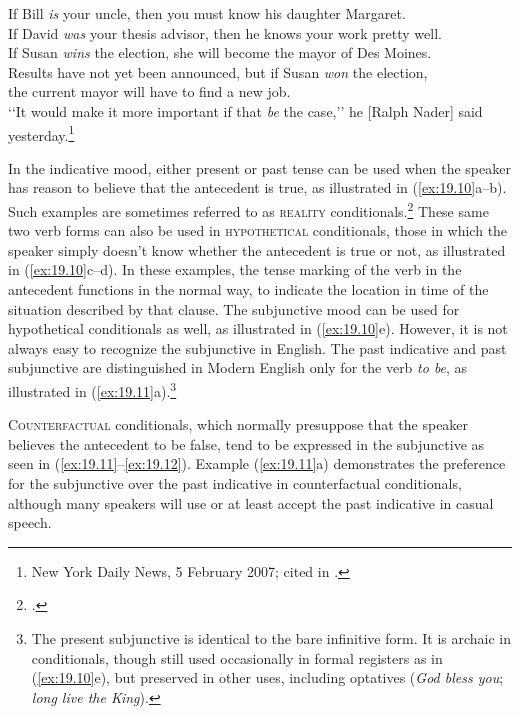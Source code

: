 \ea \label{ex:19.10}
\ea  If Bill \textit{is} your uncle, then you must know his daughter Margaret.\\
\ex If David \textit{was} your thesis advisor, then he knows your work pretty well.\\
\ex If Susan \textit{wins} the election, she will become the mayor of Des Moines.\\
\ex Results have not yet been announced, but if Susan \textit{won} the election,\\
  the current mayor will have to find a new job.\\
\ex ‘‘It would make it more important if that \textit{be} the case,’’ he [Ralph Nader] said\\
  yesterday.\footnote{New York Daily News, 5  February 2007; cited in \citet{Gomes2008}.}
                       \z
\z


In the indicative mood, either present or past tense can be used when the speaker has reason to believe that the antecedent is true, as illustrated in (\ref{ex:19.10}a--b). Such examples are sometimes referred to as \textsc{reality} conditionals.\footnote{\citet{ThompsonEtAl2007}.} These same two verb forms can also be used in \textsc{hypothetical} conditionals, those in which the speaker simply doesn’t know whether the antecedent is true or not, as illustrated in (\ref{ex:19.10}c--d). In these examples, the tense marking of the verb in the antecedent functions in the normal way, to indicate the location in time of the situation described by that clause. The subjunctive mood can be used for hypothetical conditionals as well, as illustrated in (\ref{ex:19.10}e). However, it is not always easy to recognize the subjunctive in English. The past indicative and past subjunctive are distinguished in Modern English only for the verb \textit{to be}, as illustrated in (\ref{ex:19.11}a).\footnote{The present subjunctive is identical to the bare infinitive form. It is archaic in conditionals, though still used occasionally in formal registers as in (\ref{ex:19.10}e), but preserved in other uses, including optatives (\textit{God bless you}; \textit{long live the King}).}



\textsc{Counterfactual} conditionals, which normally presuppose that the speaker believes the antecedent to be false, tend to be expressed in the subjunctive as seen in (\ref{ex:19.11}--\ref{ex:19.12}). Example (\ref{ex:19.11}a) demonstrates the preference for the subjunctive over the past indicative in counterfactual conditionals, although many speakers will use or at least accept the past indicative in casual speech.


